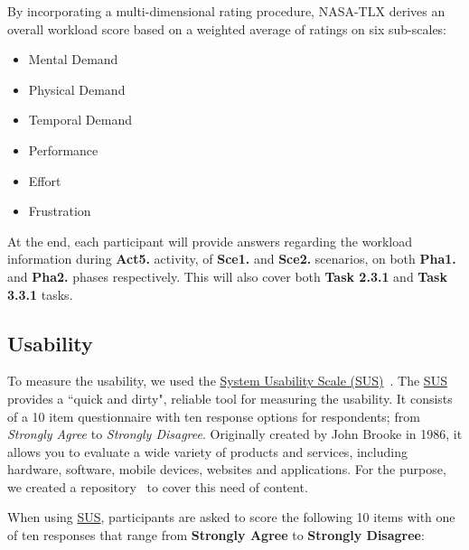 \hfill

By incorporating a multi-dimensional rating procedure, NASA-TLX derives an overall workload score based on a weighted average of ratings on six sub-scales:

\begin{itemize}
\item Mental Demand
\item Physical Demand
\item Temporal Demand
\item Performance
\item Effort
\item Frustration 
\end{itemize}

At the end, each participant will provide answers regarding the workload information during {\bf Act5.} activity, of {\bf Sce1.} and {\bf Sce2.} scenarios, on both {\bf Pha1.} and {\bf Pha2.} phases respectively. This will also cover both {\bf Task 2.3.1} and {\bf Task 3.3.1} tasks.


\subsection{Usability}

To measure the usability, we used the \hyperlink{https://en.wikipedia.org/wiki/System_usability_scale}{System Usability Scale (SUS)}~\cite{orfanou2015perceived}. The \hyperlink{https://en.wikipedia.org/wiki/System_usability_scale}{SUS} provides a ``quick and dirty", reliable tool for measuring the usability. It consists of a 10 item questionnaire with ten response options for respondents; from {\it Strongly Agree} to {\it Strongly Disagree}. Originally created by John Brooke in 1986, it allows you to evaluate a wide variety of products and services, including hardware, software, mobile devices, websites and applications. For the purpose, we created a repository~\cite{https://doi.org/10.13140/rg.2.2.26978.79044, francisco_maria_calisto_2018_1435042} to cover this need of content.

\hfill

When using \hyperlink{https://en.wikipedia.org/wiki/System_usability_scale}{SUS}, participants are asked to score the following 10 items with one of ten responses that range from {\bf Strongly Agree} to {\bf Strongly Disagree}:

